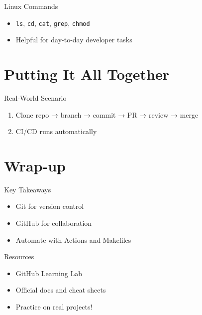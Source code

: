 \documentclass[aspectratio=169]{beamer} %
\begin{document}
\begin{frame}{Linux Commands}
  \begin{itemize}
    \item \texttt{ls}, \texttt{cd}, \texttt{cat}, \texttt{grep}, \texttt{chmod}
    \item Helpful for day-to-day developer tasks
  \end{itemize}
\end{frame}

\section{Putting It All Together}

\begin{frame}{Real-World Scenario}
  \begin{enumerate}
    \item Clone repo → branch → commit → PR → review → merge
    \item CI/CD runs automatically
  \end{enumerate}
\end{frame}

\section{Wrap-up}

\begin{frame}{Key Takeaways}
  \begin{itemize}
    \item Git for version control
    \item GitHub for collaboration
    \item Automate with Actions and Makefiles
  \end{itemize}
\end{frame}

\begin{frame}{Resources}
  \begin{itemize}
    \item GitHub Learning Lab
    \item Official docs and cheat sheets
    \item Practice on real projects!
  \end{itemize}
\end{frame}
\end{document}
